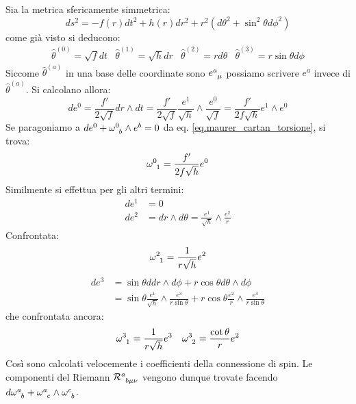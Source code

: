 \begin{esempio}
Sia la metrica sfericamente simmetrica:
    \begin{equation*}
        ds^2 = - f(r) dt^2 + h(r)dr^2 + r^2(d\theta^2 + \sin^2\theta d\phi^2)
    \end{equation*}
come già visto si deducono:
    \begin{equation*}
        \begin{array}{cccc}
            \hat{\theta}^{(0)} = \sqrt{f}dt & \hat{\theta}^{(1)} = \sqrt{h}dr & \hat{\theta}^{(2)} = rd\theta & \hat{\theta}^{(3)} = r\sin\theta d\phi
        \end{array}
    \end{equation*}
Siccome $\hat{\theta}^{(a)}$  in una base delle coordinate sono $\tensor{e}{^a_\mu}$ possiamo scrivere $e^a$ invece di $\hat{\theta}^{(a)}$. Si calcolano allora:
\begin{equation*}
    d e^0 = \frac{f'}{2\sqrt{f}}dr\wedge dt = \frac{f'}{2\sqrt{f}} \frac{e^1}{\sqrt{h}}\wedge \frac{e^0}{\sqrt{f}} = \frac{f'}{2f\sqrt{h}}e^1 \wedge e^0
\end{equation*}
Se paragoniamo a $de^0 + \tensor{\omega}{^0_b}\wedge e^b = 0$ da eq. \ref{eq.maurer_cartan_torsione}, si trova:
\begin{equation*}
    \tensor{\omega}{^0_1} = \frac{f'}{2f\sqrt{h}}e^0
\end{equation*}
Similmente si effettua per gli altri termini:
\begin{align*}
d e^1 &= 0 \\
d e^2 &= dr\wedge d\theta = \frac{e^1}{\sqrt{h}}\wedge \frac{e^2}{r}
\end{align*}
Confrontata:
\begin{equation*}
    \tensor{\omega}{^2_1} = \frac{1}{r\sqrt{h}}e^2
\end{equation*}
\begin{align*}
    de^3 &= \sin\theta ddr\wedge d\phi + r\cos\theta d\theta \wedge d\phi \\
     &= \sin\theta \frac{e^1}{\sqrt{h}} \wedge \frac{e^3}{r\sin\theta} + r\cos\theta \frac{e^2}{r}\wedge\frac{e^3}{r\sin\theta}
\end{align*}
che confrontata ancora:
\begin{align*}
        \tensor{\omega}{^3_1} = \frac{1}{r\sqrt{h}}e^3 && \tensor{\omega}{^3_2}= \frac{\cot \theta}{r}e^2
\end{align*}
Così sono calcolati velocemente i coefficienti della connessione di spin. Le componenti del Riemann $\tensor{\mathcal R}{^a_{b\mu\nu}}$ vengono dunque trovate facendo $d\tensor{\omega}{^a_b} + \tensor{\omega}{^a_c}\wedge\tensor{\omega}{^c_b}$.
\end{esempio}



